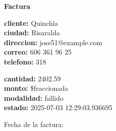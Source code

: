 \documentclass{article}
\begin{document}
\begin{center}
    {\LARGE \textbf{Factura}}\\[1cm]
\end{center}

\textbf{cliente:} Quinchía \\
\textbf{ciudad:} Risaralda \\
\textbf{direccion:} jose51@example.com \\
\textbf{correo:} 606 361 96 25 \\
\textbf{telefono:} 318 \\

\vspace{0.5cm}

\textbf{cantidad:} 2402.59 \\
\textbf{monto:} \$fraccionada \\
\textbf{modalidad:} fallido \\
\textbf{estado:} 2025-07-03 12:29:03.936695 \\

\vspace{1cm}

Fecha de la factura: 
\end{document}
